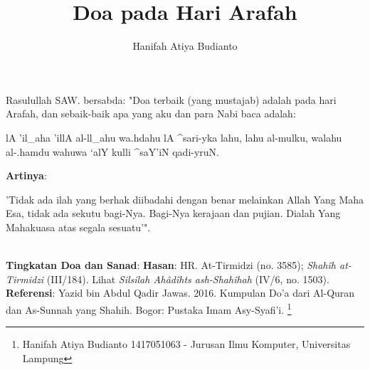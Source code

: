 \documentclass[a4paper,12pt]{article}
\title{\Large Doa pada Hari Arafah}
\author{\calligra Hanifah Atiya Budianto}
\begin{document}
\sffamily
\maketitle 
\fullvocalize
{}
\par
\indent
Rasulullah SAW. bersabda: "Doa terbaik (yang mustajab) adalah pada hari 
Arafah, dan sebaik-baik apa yang aku dan para Nabi baca adalah:\\
\begin{arabtext}
\noindent
lA 'il_aha 'illA al-ll_ahu wa.hdahu lA ^sari-yka lahu, lahu al-mulku, 
walahu al-.hamdu wahuwa `alY kulli ^saY'iN qadi-yruN.\\
\end{arabtext}
\noindent
\textbf{Artinya}:
\par
\indent
'Tidak ada ilah yang berhak diibadahi dengan benar melainkan Allah Yang 
Maha Esa, tidak ada sekutu bagi-Nya. Bagi-Nya kerajaan dan pujian. Dialah 
Yang Mahakuasa atas segala sesuatu'".\\\\
\par
\noindent
\textbf{Tingkatan Doa dan Sanad}: \textbf{Hasan}: HR. At-Tirmidzi (no. 
3585); \textit{Shah\^{i}h at-Tirmidzi} (III/184). Lihat \textit{Silsilah 
Ah\^{a}d\^{i}hts ash-Shah\^{i}hah} (IV/6, no. 1503).\\
\textbf{Referensi}: Yazid bin Abdul Qadir Jawas. 2016. Kumpulan Do'a dari
Al-Quran dan As-Sunnah yang Shahih. Bogor: Pustaka Imam Asy-Syafi'i.
\footnote{Hanifah Atiya Budianto 1417051063 - Jurusan Ilmu Komputer,
Universitas Lampung}
\end{document}
